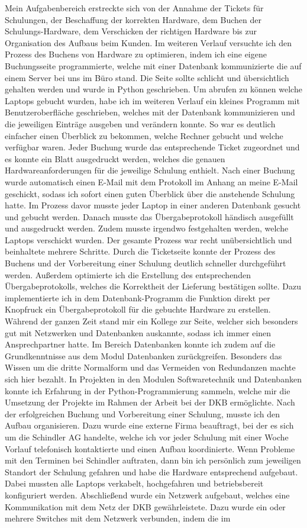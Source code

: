 Mein Aufgabenbereich erstreckte sich von der Annahme der Tickets für Schulungen, der Beschaffung der korrekten Hardware, dem Buchen der Schulungs-Hardware, dem Verschicken der richtigen Hardware bis zur Organisation des Aufbaus beim Kunden. Im weiteren Verlauf versuchte ich den Prozess des Buchens von Hardware zu optimieren, indem ich eine eigene Buchungsseite programmierte, welche mit einer Datenbank kommunizierte die auf einem Server bei uns im Büro stand. Die Seite sollte schlicht und übersichtlich gehalten werden und wurde in Python geschrieben. Um abrufen zu können welche Laptops gebucht wurden, habe ich im weiteren Verlauf ein kleines Programm mit Benutzeroberfläche geschrieben, welches mit der Datenbank kommunizieren und die jeweiligen Einträge ausgeben und verändern konnte. So war es deutlich einfacher einen Überblick zu bekommen, welche Rechner gebucht und welche verfügbar waren. Jeder Buchung wurde das entsprechende Ticket zugeordnet und es konnte ein Blatt ausgedruckt werden, welches die genauen Hardwareanforderungen für die jeweilige Schulung enthielt. Nach einer Buchung wurde automatisch einen E-Mail mit dem Protokoll im Anhang an meine E-Mail geschickt, sodass ich sofort einen guten Überblick über die anstehende Schulung hatte. Im Prozess davor musste jeder Laptop in einer anderen Datenbank gesucht und gebucht werden. Danach musste das Übergabeprotokoll händisch ausgefüllt und ausgedruckt werden. Zudem musste irgendwo festgehalten werden, welche Laptops verschickt wurden. Der gesamte Prozess war recht unübersichtlich und beinhaltete mehrere Schritte. Durch die Ticketseite konnte der Prozess des Buchens und der Vorbereitung einer Schulung deutlich schneller durchgeführt werden. Außerdem optimierte ich die Erstellung des entsprechenden Übergabeprotokolls, welches die Korrektheit der Lieferung bestätigen sollte. Dazu implementierte ich in dem Datenbank-Programm die Funktion direkt per Knopfruck ein Übergabeprotokoll für die gebuchte Hardware zu erstellen. Während der ganzen Zeit stand mir ein Kollege zur Seite, welcher sich besonders gut mit Netzwerken und Datenbanken auskannte, sodass ich immer einen Ansprechpartner hatte. Im Bereich Datenbanken konnte ich zudem auf die Grundkenntnisse aus dem Modul Datenbanken zurückgreifen. Besonders das Wissen um die dritte Normalform und das Vermeiden von Redundanzen machte sich hier bezahlt. In Projekten in den Modulen Softwaretechnik und Datenbanken konnte ich Erfahrung in der Python-Programmierung sammeln, welche mir die Umsetzung der Projekte im Rahmen der Arbeit bei der DKB ermöglichte. Nach der erfolgreichen Buchung und Vorbereitung einer Schulung, musste ich den Aufbau organisieren. Dazu wurde eine externe Firma beauftragt, bei der es sich um die Schindler AG handelte, welche ich vor jeder Schulung mit einer Woche Vorlauf telefonisch kontaktierte und einen Aufbau koordinierte. Wenn Probleme mit den Terminen bei Schindler auftraten, dann bin ich persönlich zum jeweiligen Standort der Schulung gefahren und habe die Hardware entsprechend aufgebaut. Dabei mussten alle Laptops verkabelt, hochgefahren und betriebsbereit konfiguriert werden. Abschließend wurde ein Netzwerk aufgebaut, welches eine Kommunikation mit dem Netz der DKB gewährleistete. Dazu wurde ein oder mehrere Switches mit dem Netzwerk verbunden, indem die im 